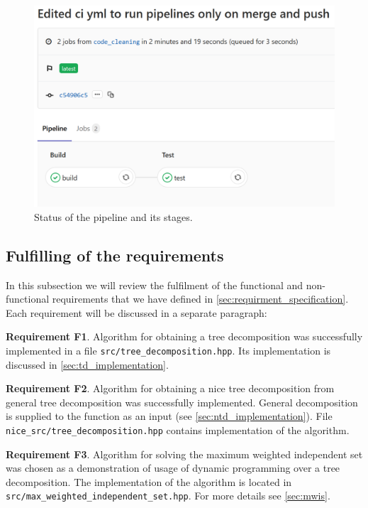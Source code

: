 \documentclass[thesis=B,english]{FITthesis}[2019/03/21]
\begin{document}
\begin{figure}[H]
	\centering
 	\includegraphics[width=1\textwidth]{img/pipeline}
 	\caption[Status of the pipeline and its stages]{Status of the pipeline and its stages.}
 	\label{fig:pipeline}
\end{figure}

\subsection{Fulfilling of the requirements}\label{ssec:fulfilling_requirments}
In this subsection we will review the fulfilment of the functional and non-functional requirements that we have defined in \autoref{sec:requirment_specification}. Each requirement will be discussed in a separate paragraph:\bigskip

\noindent\textbf{Requirement F1}. Algorithm for obtaining a tree decomposition was successfully implemented in a file \texttt{src/tree\_decomposition.hpp}. Its implementation is discussed in \autoref{sec:td_implementation}.\newpage

\noindent\textbf{Requirement F2}. Algorithm for obtaining a nice tree decomposition from general tree decomposition was successfully implemented. General decomposition is supplied to the function as an input (see \autoref{sec:ntd_implementation}). File \texttt{nice\_src/\-tree\_decomposition.hpp} contains implementation of the algorithm.\bigskip

\noindent\textbf{Requirement F3}. Algorithm for solving the maximum weighted independent set was chosen as a demonstration of usage of dynamic programming over a tree decomposition. The implementation of the algorithm is located in \texttt{src/max\_weighted\_independent\_set.hpp}. For more details see \autoref{sec:mwis}.\bigskip
\end{document}
